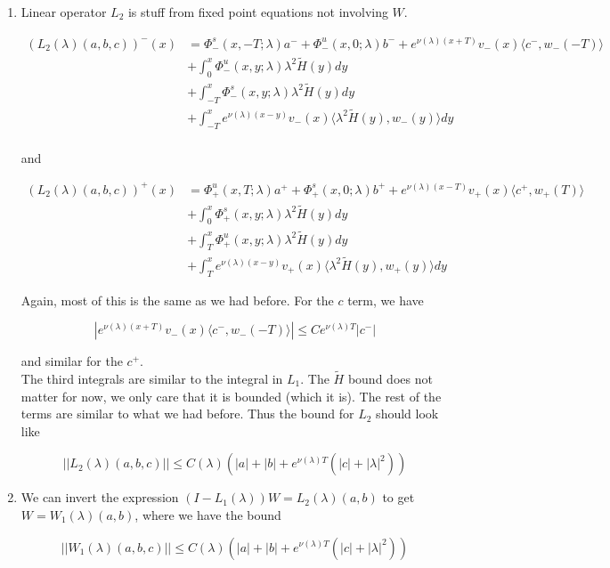 \documentclass[12pt]{article}
\begin{document}
\begin{enumerate}
\item Linear operator $L_2$ is stuff from fixed point equations not involving $W$.


\begin{align*}
(L_2(\lambda)(a,b,c))^-(x) &= \Phi^s_-(x, -T; \lambda)a^- + \Phi^u_-(x, 0; \lambda)b^- + e^{\nu(\lambda)(x+T)} v_-(x) \langle c^-, w_-(-T) \rangle \\
&+ \int_0^x \Phi^u_-(x, y; \lambda) \lambda^2 \tilde{H}(y) dy \\
&+ \int_{-T}^x \Phi^s_-(x, y; \lambda) \lambda^2 \tilde{H}(y) dy \\
&+ \int_{-T}^x 
e^{\nu(\lambda)(x-y)} v_-(x) \langle \lambda^2 \tilde{H}(y), w_-(y) \rangle dy \\
\end{align*}

and

\begin{align*}
(L_2(\lambda)(a,b,c))^+(x) &= \Phi^u_+(x, T; \lambda)a^+ + \Phi^s_+(x, 0; \lambda)b^+ + e^{\nu(\lambda)(x - T)} v_+(x) \langle c^+, w_+(T) \rangle\\
&+ \int_0^x \Phi^s_+(x, y; \lambda) \lambda^2 \tilde{H}(y) dy \\
&+ \int_T^x \Phi^u_+(x, y; \lambda) \lambda^2 \tilde{H}(y) dy \\
&+ \int_T^x e^{\nu(\lambda)(x-y)} v_+(x) \langle \lambda^2 \tilde{H}(y), w_+(y) \rangle dy
\end{align*}

Again, most of this is the same as we had before. For the $c$ term, we have 

\[
|e^{\nu(\lambda)(x+T)} v_-(x) \langle c^-, w_-(-T) \rangle | \leq C e^{\nu(\lambda)T}|c^-|
\]

and similar for the $c^+$.\\

The third integrals are similar to the integral in $L_1$. The $\tilde{H}$ bound does not matter for now, we only care that it is bounded (which it is). The rest of the terms are similar to what we had before. Thus the bound for $L_2$ should look like

\[
||L_2(\lambda)(a,b,c)|| \leq C(\lambda) (|a| + |b| + e^{\nu(\lambda)T}(|c| + |\lambda|^2))
\]


\item We can invert the expression $(I - L_1(\lambda))W = L_2(\lambda)(a,b)$ to get $W = W_1(\lambda)(a,b)$, where we have the bound

\[
||W_1(\lambda)(a,b,c)|| \leq C(\lambda) (|a| + |b| + e^{\nu(\lambda)T}(|c| + |\lambda|^2))
\]


\end{enumerate}
\end{document}
